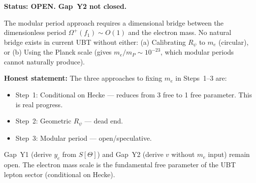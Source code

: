 \documentclass[12pt,a4paper]{article}
\theoremstyle{definition}
\theoremstyle{remark}
\begin{document}
\begin{gapbox}
\textbf{Status: OPEN.  Gap~Y2 not closed.}

The modular period approach requires a dimensional bridge between
the dimensionless period $\Omega^+(f_1) \sim O(1)$ and the electron mass.
No natural bridge exists in current UBT without either:
(a) Calibrating $R_\psi$ to $m_e$ (circular), or
(b) Using the Planck scale (gives $m_e/m_P \sim 10^{-23}$, which modular
    periods cannot naturally produce).

\textbf{Honest statement:} The three approaches to fixing $m_e$ in Steps~1--3
are:
\begin{itemize}
  \item Step~1: Conditional on Hecke --- reduces from 3 free to 1 free
        parameter.  This is real progress.
  \item Step~2: Geometric $R_\psi$ --- dead end.
  \item Step~3: Modular period --- open/speculative.
\end{itemize}

Gap~Y1 (derive $y_e$ from $S[\Theta]$) and Gap~Y2 (derive $v$ without
$m_e$ input) remain open.  The electron mass scale is the fundamental
free parameter of the UBT lepton sector (conditional on Hecke).
\end{gapbox}

\ifdefined\INCLUDEMODE
\else
  
\end{document}
